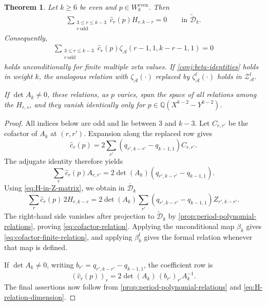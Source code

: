 \documentclass[12pt]{amsart}
\numberwithin{equation}{section}
\theoremstyle{plain}
\newtheorem{thm}{Theorem}[section]
\newcommand{\even}{\mathrm{even}}
\newcommand{\QQ}{\mathbb{Q}}
\newcommand{\ZAf}{{\mathcal Z_{\mathcal A}^{\mathrm f}}}
\newcommand{\za}[1]{\zeta_{\mathcal A}(#1)}
\newcommand{\zaf}[1]{\zeta_{\mathcal A}^{\mathrm f}(#1)}
\newcommand{\Dtk}{\widetilde{\mathcal D}_k}
\newcommand{\Dbk}{\overline{\mathcal D}_k}
\begin{document}
\begin{thm}\label{thm:cofactor-relations}
Let $k\geq6$ be even and $p\in W_k^{\even}$. Then
\begin{align}\label{eq:cofactor-relation}
 \sum_{\substack{3\leq r\leq k-3\\r\ \mathrm{odd}}}
 \widehat c_r(p)H_{r,k-r}=0
 \qquad\text{in }\Dtk.
\end{align}
Consequently,
\begin{align}\label{eq:cofactor-finite-relation}
 \sum_{\substack{3\leq r\leq k-3\\r\ \mathrm{odd}}}
 \widehat c_r(p)\za{r-1,1,k-r-1,1}=0
\end{align}
holds unconditionally for finite multiple zeta values. If
\cref{conj:beta-identities} holds in weight $k$, the analogous relation with
$\za{\cdot}$ replaced by $\zaf{\cdot}$ holds in $\ZAf$.

If $\det A_k\neq0$, these relations, as $p$ varies, span the space of all
relations among the $H_{r,s}$, and they vanish identically only for
$p\in\QQ(X^{k-2}-Y^{k-2})$.
\end{thm}

\begin{proof}
All indices below are odd and lie between $3$ and $k-3$. Let $C_{r,r'}$ be
the cofactor of $A_k$ at $(r,r')$. Expansion along the replaced row gives
\[
 \widehat c_r(p)=2\sum_{r'}(q_{r',k-r'}-q_{k-1,1})C_{r,r'}.
\]
The adjugate identity therefore yields
\[
 \sum_r\widehat c_r(p)A_{r,r'}
 =2\det(A_k)(q_{r',k-r'}-q_{k-1,1}).
\]
Using \eqref{eq:H-in-Z-matrix}, we obtain in $\Dbk$
\[
 \sum_r\widehat c_r(p)\,2H_{r,k-r}
 =2\det(A_k)\sum_{r'}
 (q_{r',k-r'}-q_{k-1,1})Z_{r',k-r'}.
\]
The right-hand side vanishes after projection to $\Dtk$ by
\cref{prop:period-polynomial-relations}, proving
\eqref{eq:cofactor-relation}. Applying the unconditional map $\beta_k$
gives \eqref{eq:cofactor-finite-relation}, and applying $\beta_k^{\mathrm f}$
gives the formal relation whenever that map is defined.

If $\det A_k\neq0$, writing
$b_{r'}=q_{r',k-r'}-q_{k-1,1}$, the coefficient row is
\[
 (\widehat c_r(p))_r=2\det(A_k)\,(b_{r'})_{r'}A_k^{-1}.
\]
The final assertions now follow from
\cref{prop:period-polynomial-relations} and
\eqref{eq:H-relation-dimension}.
\end{proof}
\end{document}
